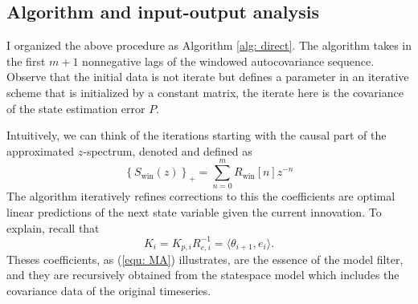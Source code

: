 \documentclass[12pt]{amsart}
\begin{document}
\subsection{Algorithm and input-output analysis}
I organized the above procedure as Algorithm \ref{alg: direct}. The algorithm takes in the first $m+1$ nonnegative lags of the windowed autocovariance sequence. Observe that the initial data is not iterate but defines a parameter in an iterative scheme that is initialized by a constant matrix, the iterate here is the covariance of the state estimation error $P$. 

Intuitively, we can think of the iterations starting with the causal part of the approximated $z$-spectrum, denoted and defined as 
$$\left\{S_\text{win}(z)\right\}_+ = \sum_{n=0}^{m} R_\text{win}[n]z^{-n}$$
The algorithm iteratively refines corrections to this the coefficients are optimal linear predictions of the next state variable given the current innovation. To explain, recall that $$K_i = K_{p,i}R_{e,i}^{-1} = \langle \theta_{i+1}, e_i \rangle.$$
Theses coefficients, as (\ref{equ: MA}) illustrates, are the essence of the model filter, and they are recursively obtained from the statespace model which includes the covariance data of the original timeseries. 
\end{document}
